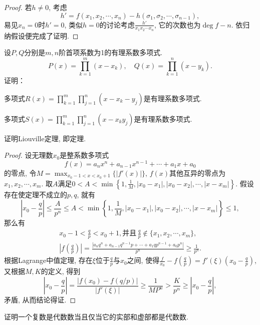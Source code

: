 \begin{quizb}
\begin{proof}
若\(h\ne 0\), 考虑\[h'=f(x_1,x_2,\cdots,x_{n})-h(\sigma_1,\sigma_2,\cdots,\sigma_{n-1}),\]
易见\(x_n=0\)时\(h'=0\), 类似\(h=0\)的讨论考虑\(\frac{h'}{x_1x_2\cdots x_n}\), 它的次数也为\(\deg f -n\). 依归纳假设便完成了证明.
\end{proof}
\woe 设\(P,Q\)分别是\(m,n\)阶首项系数为1的有理系数多项式.\[P(x)=\prod_{k=1}^{m}(x-x_k),\quad Q(x)=\prod_{k=1}^{n}(x-y_k).\]证明：
        \begin{quizs}
            \item 多项式\(R(x)=\prod_{k=1}^{m}\prod_{j=1}^{n}(x-x_k-y_j)\)是有理系数多项式.
            \item 多项式\(S(x)=\prod_{k=1}^{m}\prod_{j=1}^{n}(x-x_ky_j)\)是有理系数多项式.
        \end{quizs}
\woe 证明Liouville定理, 即定理.
\begin{proof}
设无理数\(x_0\)是整系数多项式\[f(x)=a_nx^n+a_{n-1}x^{n-1}+\cdots+a_1x+a_0\]的零点, 令\(M=\max_{x_0-1<x<x_0+1}\{|f'(x)|\}\), \(f(x)\)其他互异的零点为\(x_1,x_2,\cdots,x_m\). 取\(A\)满足\(0<A<\min\left\lbrace 1,\frac{1}{M},|x_0-x_1|,|x_0-x_2|,\cdots,|x-x_m| \right\rbrace\). 假设存在使定理不成立的\(p,q\), 就有\[\left|x_0-\frac{q}{p}\right|\leqslant\frac{A}{p^n}\leqslant A<\min\left\lbrace 1,\frac{1}{M},|x_0-x_1|,|x_0-x_2|,\cdots,|x-x_m| \right\rbrace\leqslant 1,\]那么有
\begin{gather*}
x_0-1<\frac{q}{p}<x_0+1,\text{并且}\,\frac{q}{p}\notin\{x_1,x_2,\cdots,x_m\},\\
\left|f\left(\frac{q}{p}\right)\right|=\frac{\left|a_nq^n+a_{n-1}q^{n-1}p+\cdots+a_1qp^{n-1}+a_0p^n\right|}{p^n}\geqslant\frac{1}{p^n}.
\end{gather*}根据Lagrange中值定理, 存在\(\xi\)位于\(\frac{q}{p}\)与\(x_0\)之间, 使得\(\frac{f}{x_0}-f\left(\frac{q}{p}\right)=f'(\xi)\left(x_0-\frac{q}{p}\right)\), 又根据\(M,K\)的定义, 得到\[\left|x_0-\frac{q}{p}\right|=\frac{|f(x_0)-f(q/p)|}{|f'(\xi)|}\geqslant\frac{1}{MP^n}>\frac{K}{p^n}\geqslant\left|x_0-\frac{q}{p}\right| ,\]矛盾, 从而结论得证.
\end{proof}
\woe 证明一个复数是代数数当且仅当它的实部和虚部都是代数数.
\end{quizb}
